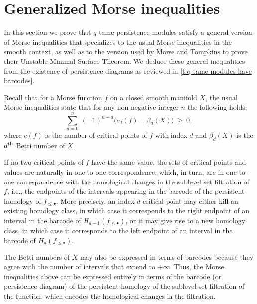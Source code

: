 
\section{Generalized Morse inequalities} \label{s:inequalities}

In this section we prove that $q$-tame persistence modules satisfy a general version of Morse inequalities that specializes to the usual Morse inequalities in the smooth context, as well as to the version used by Morse and Tompkins to prove their Unstable Minimal Surface Theorem.
We deduce these general inequalities from the existence of persistence diagrams as reviewed in \cref{t:q-tame modules have barcodes}.

Recall that for a Morse function $f$ on a closed smooth manifold $X$, the usual Morse inequalities state that for any non-negative integer $n$ the following holds:
\begin{equation} \label{e:classical morse inequalities}
\sum_{d=0}^n \ (-1)^{n-d} \big( c_{d}(f) - \beta_{d}(X) \big) \ \geq \ 0,
\end{equation}
where $c(f)$ is the number of critical points of $f$ with index $d$ and $\beta_{d}(X)$ is the $d^{\mathrm{th}}$ Betti number of $X$.

If no two critical points of $f$ have the same value, the sets of critical points and values are naturally in one-to-one correspondence, which, in turn, are in one-to-one correspondence with the homological changes in the sublevel set filtration of $f$, i.e., the endpoints of the intervals appearing in the barcode of the persistent homology of $f_{\leq \bullet}$.
More precisely, an index $d$ critical point may either kill an existing homology class, in which case it corresponds to the right endpoint of an interval in the barcode of $H_{d-1}(f_{\leq \bullet})$, or it may give rise to a new homology class, in which case it corresponds to the left endpoint of an interval in the barcode of $H_d(f_{\leq \bullet})$.

The Betti numbers of $X$ may also be expressed in terms of barcodes because they agree with the number of intervals that extend to $+\infty$.
Thus, the Morse inequalities above can be expressed entirely in terms of the barcode (or persistence diagram) of the persistent homology of the sublevel set filtration of the function, which encodes the homological changes in the filtration.

